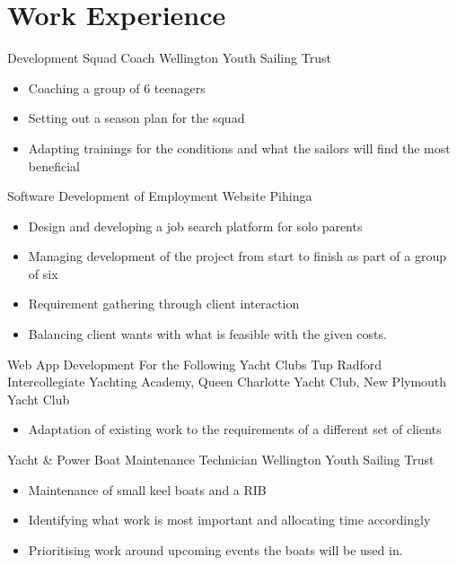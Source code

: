 \documentclass[a4paper]{twentysecondcv} %
\begin{document}

\section{Work Experience}

\begin{workexperience} %
    {Development Squad Coach}
    {Wellington Youth Sailing Trust}
    {
        \begin{itemize}
            \item Coaching a group of 6 teenagers
            \item Setting out a season plan for the squad
            \item Adapting trainings for the conditions and what the sailors will find the most beneficial 
        \end{itemize}
    }

    {Software Development of Employment Website}
    {Pihinga}
    {
        \begin{itemize}
            \item Design and developing a job search platform for solo parents
            \item Managing development of the project from start to finish as part of a group of six
            \item Requirement gathering through client interaction
            \item Balancing client wants with what is feasible with the given costs.
        \end{itemize}
    }

    {Web App Development For the Following Yacht Clubs}
    {Tup Radford Intercollegiate Yachting Academy, Queen Charlotte Yacht Club, New Plymouth Yacht Club}
    {
        \begin{itemize}
            \item Adaptation of existing work to the requirements of a different set of clients
        \end{itemize}
    }

    {Yacht \& Power Boat Maintenance Technician}
    {Wellington Youth Sailing Trust}
    {
        \begin{itemize}
            \item Maintenance of small keel boats and a RIB
            \item Identifying what work is most important and allocating time accordingly
            \item Prioritising work around upcoming events the boats will be used in.
        \end{itemize}
    }


\end{workexperience}
\end{document}
